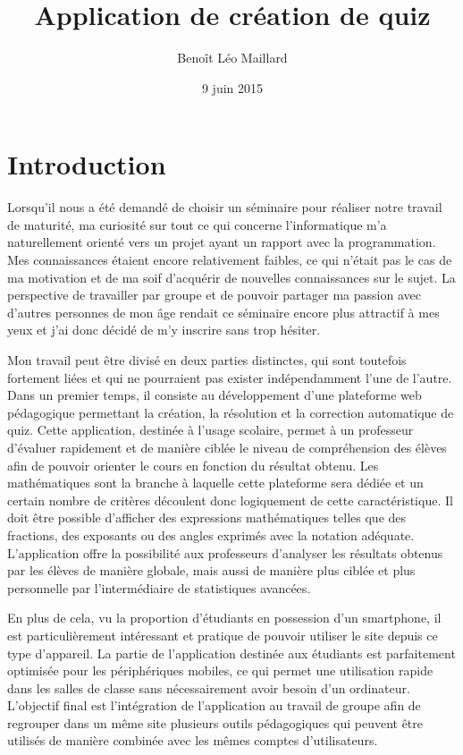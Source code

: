 \documentclass[a4,10pt,french]{sphinxmanual}
\title{Application de création de quiz}
\date{9 juin 2015}
\author{Benoît Léo Maillard}
\begin{document}
\maketitle
\tableofcontents
{}\label{index::doc}



\chapter{Introduction}
\label{introduction:application-de-creation-de-quiz}\label{introduction::doc}\label{introduction:introduction}
Lorsqu'il nous a été demandé de choisir un séminaire pour réaliser notre travail de maturité,
ma curiosité sur tout ce qui concerne l'informatique m'a naturellement orienté
vers un projet ayant un rapport avec la programmation. Mes connaissances étaient
encore relativement faibles, ce qui n'était pas le cas de ma motivation et de ma
soif d'acquérir de nouvelles connaissances sur le sujet. La perspective de travailler
par groupe et de pouvoir partager ma passion avec d'autres personnes de mon âge rendait
ce séminaire encore plus attractif à mes yeux et j'ai donc décidé de m'y inscrire
sans trop hésiter.

Mon travail peut être divisé en deux parties distinctes, qui sont toutefois fortement
liées et qui ne pourraient pas exister indépendamment l'une de l'autre. Dans un premier
temps, il consiste au développement d'une plateforme web pédagogique permettant
la création, la résolution et la correction automatique de quiz. Cette application,
destinée à l'usage scolaire, permet à un professeur d'évaluer rapidement et de
manière ciblée le niveau de compréhension des élèves afin de pouvoir orienter
le cours en fonction du résultat obtenu. Les mathématiques sont la branche à laquelle
cette plateforme sera dédiée et un certain nombre de critères découlent donc logiquement
de cette caractéristique. Il doit être possible d'afficher des expressions mathématiques
telles que des fractions, des exposants ou des angles exprimés avec la notation adéquate.
L'application offre la possibilité aux professeurs d'analyser les résultats
obtenus par les élèves de manière globale, mais aussi de manière plus ciblée et plus
personnelle par l'intermédiaire de statistiques avancées.

En plus de cela, vu la proportion d'étudiants en possession d'un smartphone, il est
particulièrement intéressant et pratique de pouvoir utiliser le site depuis ce type
d'appareil. La partie de l'application destinée aux étudiants est parfaitement optimisée pour
les périphériques mobiles, ce qui permet une utilisation rapide dans les salles de
classe sans nécessairement avoir besoin d'un ordinateur. L'objectif final est l'intégration
de l'application au travail de groupe afin de regrouper dans un même site plusieurs outils
pédagogiques qui peuvent être utilisés de manière combinée avec les mêmes comptes d'utilisateurs.
\end{document}
